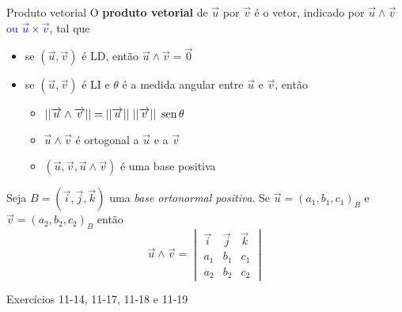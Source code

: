\begin{frame}{Produto vetorial}
    O \textbf{produto vetorial} de \(\vec{u}\) por \(\vec{v}\) é o vetor, indicado por
    \(\vec{u}\wedge\vec{v}\) \textcolor{blue}{ou \(\vec{u}\times\vec{v}\)}, tal que
    \begin{itemize}
        \item se \((\vec{u},\vec{v})\) é LD, então \(\vec{u}\wedge\vec{v}=\vec{0}\)
        \item se \((\vec{u},\vec{v})\) é LI e \(\theta\) é a medida angular entre \(\vec{u}\) e \(\vec{v}\),
            então
            \begin{itemize}
                \item \(||\overrightarrow{u}\wedge\overrightarrow{v}||=||\overrightarrow{u}||~||\overrightarrow{v}||~\operatorname{sen}{\theta}\)
                \item \(\vec{u}\wedge\vec{v}\) é ortogonal a \(\vec{u}\) e a \(\vec{v}\)
                \item \((\vec{u},\vec{v}, \vec{u}\wedge\vec{v})\) é uma base positiva
            \end{itemize}
    \end{itemize}

    \vspace{1cm}
    \pause
    Seja \(B=(\vec{i},\vec{j},\vec{k})\) uma \textit{base ortonormal positiva}. Se \(\vec{u}=(a_1,b_1,c_1)_B\) e
    \(\vec{v}=(a_2,b_2,c_2)_B\) então
    \[
        \vec{u}\wedge\vec{v}=
        \begin{vmatrix}
            \vec{i} & \vec{j} & \vec{k} \\
            a_1 & b_1 & c_1 \\
            a_2 & b_2 & c_2
        \end{vmatrix}
    \]

    Exercícios 11-14, 11-17, 11-18 e 11-19
\end{frame}

